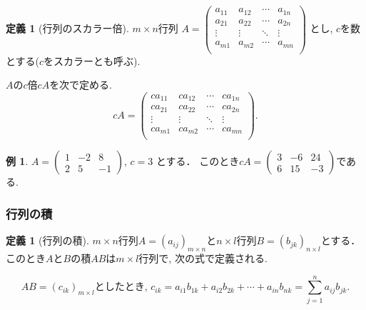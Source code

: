 \documentclass[dvipdfmx,a4paper,11pt]{article}
\theoremstyle{definition}
\newtheorem{dfn}[thm]{定義}
\newtheorem{exa}[thm]{例}
\begin{document}
  \begin{tcolorbox}[
    colback = white,
    colframe = green!35!black,
    fonttitle = \bfseries,
    breakable = true]
    \begin{dfn}[行列のスカラー倍]
    \text{}
    
 $m \times n$行列
 $
A=\begin{pmatrix}
a_{11}& a_{12} & \cdots &a_{1n} \\
a_{21}& a_{22} & \cdots &a_{2n} \\
\vdots& \vdots	&	\ddots   &	\vdots \\
a_{m1}& a_{m2} & \cdots &a_{mn} \\
\end{pmatrix}$
とし, $c$を数とする($c$をスカラーとも呼ぶ).

$A$の$c$倍$cA$を次で定める.
$$
cA=
\begin{pmatrix}
ca_{11}&c a_{12} & \cdots &ca_{1n} \\
ca_{21}& ca_{22} & \cdots &ca_{2n} \\
\vdots& \vdots	&	\ddots   &	\vdots \\
ca_{m1}& ca_{m2} & \cdots &ca_{mn} \\
\end{pmatrix}.
$$
  \end{dfn}
 \end{tcolorbox}

\begin{exa}
 $A = 
 \begin{pmatrix}
 1 &-2&8 \\
 2&5&-1
 \end{pmatrix}
 $,
 $
 c =3
 $
 とする．
 このとき$
 cA =
 \begin{pmatrix}
 3 &-6&24 \\
 6&15&-3
 \end{pmatrix}
 $である.
 \end{exa}
 
  \subsubsection{行列の積}
 
  \begin{tcolorbox}[
    colback = white,
    colframe = green!35!black,
    fonttitle = \bfseries,
    breakable = true]
    \begin{dfn}[行列の積]
    
 $m \times n$行列$A =(a_{ij})_{m \times n}$と$n \times l$行列$B= (b_{jk})_{n \times l}$とする．
このとき$A$と$B$の積$AB$は$m \times l$行列で, 次の式で定義される.

$$
AB = (c_{ik})_{m \times l}\text{としたとき, }
c_{ik} = a_{i1}b_{1k} + a_{i2}b_{2k} + \cdots + a_{in}b_{nk} = \sum_{j=1}^{n} a_{ij}b_{jk}.
$$
  \end{dfn}
 \end{tcolorbox}
 
\end{document}
